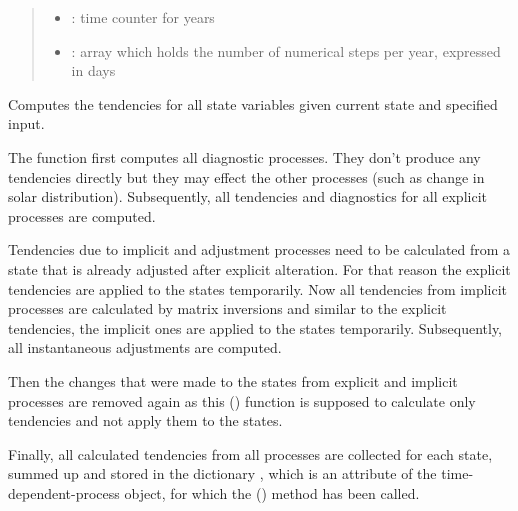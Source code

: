 \documentclass[a4paper,10pt,english]{sphinxmanual}
\begin{document}
\begin{fulllineitems}
\begin{quote}
\begin{description}
\begin{itemize}
\begin{itemize}
\item {} 
: time counter for years

\item {} 
: array which holds the number of numerical steps per year, expressed in days

\end{itemize}


\end{itemize}

\end{description}\end{quote}

\begin{fulllineitems}
\label{api/climlab.process:climlab.process.time_dependent_process.TimeDependentProcess.compute}
Computes the tendencies for all state variables given current state 
and specified input.

The function first computes all diagnostic processes. They don't produce 
any tendencies directly but they may effect the other processes (such as
change in solar distribution). Subsequently, all tendencies and 
diagnostics for all explicit processes are computed.

Tendencies due to implicit and adjustment processes need to be
calculated from a state that is already adjusted after explicit 
alteration. For that reason the explicit tendencies are applied to the 
states temporarily. Now all tendencies from implicit processes are 
calculated by matrix inversions and similar to the explicit tendencies,
the implicit ones are applied to the states temporarily. Subsequently,
all instantaneous adjustments are computed.

Then the changes that were made to the states from explicit and implicit 
processes are removed again as this 
{\hyperref[api/climlab.process:climlab.process.time_dependent_process.TimeDependentProcess.compute]{\emph{}}} ()
function is supposed to calculate only tendencies and not apply them 
to the states.

Finally, all calculated tendencies from all processes are collected 
for each state, summed up and stored in the dictionary 
, which is an attribute of the time-dependent-process 
object, for which the 
{\hyperref[api/climlab.process:climlab.process.time_dependent_process.TimeDependentProcess.compute]{\emph{}}} ()
method has been called.


\end{fulllineitems}
\end{fulllineitems}
\end{document}
